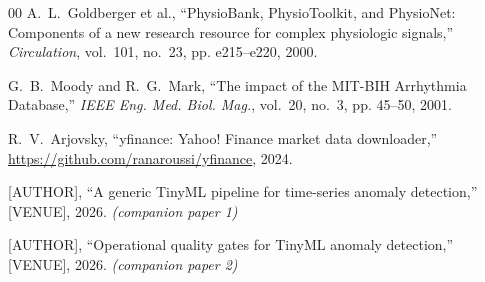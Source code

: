 \documentclass[conference]{IEEEtran}
\begin{document}
\begin{thebibliography}{00}
A.~L.~Goldberger et al.,
``PhysioBank, PhysioToolkit, and PhysioNet: Components of a new research
resource for complex physiologic signals,''
\textit{Circulation}, vol.~101, no.~23, pp. e215--e220, 2000.

G.~B.~Moody and R.~G.~Mark,
``The impact of the MIT-BIH Arrhythmia Database,''
\textit{IEEE Eng. Med. Biol. Mag.}, vol.~20, no.~3, pp. 45--50, 2001.

R.~V.~Arjovsky,
``yfinance: Yahoo! Finance market data downloader,''
\url{https://github.com/ranaroussi/yfinance}, 2024.

[AUTHOR],
``A generic TinyML pipeline for time-series anomaly detection,''
[VENUE], 2026. \textit{(companion paper 1)}

[AUTHOR],
``Operational quality gates for TinyML anomaly detection,''
[VENUE], 2026. \textit{(companion paper 2)}

\end{thebibliography}
\end{document}
